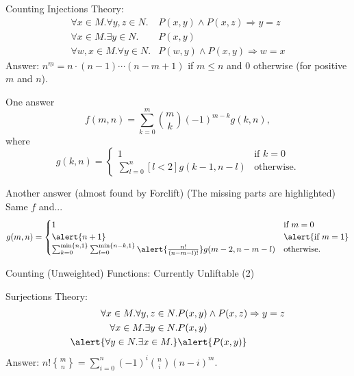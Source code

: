 \documentclass{beamer}
\DeclareRobustCommand{\stirling}{\genfrac\{\}{0pt}{}}
\begin{document}
\begin{frame}{Counting Injections}
  Theory:
  \begin{align*}
    \forall x \in M. \forall y, z \in N. &P(x, y) \land P(x, z) \Rightarrow y=z \\
    \forall x \in M. \exists y \in N. &P(x, y) \\
    \forall w, x \in M. \forall y \in N. &P(w, y) \land P(x, y) \Rightarrow w=x
  \end{align*}
  Answer: $n^{\underline{m}} = n \cdot (n-1)\cdots(n-m+1)$ if $m \le n$ and $0$ otherwise (for positive $m$ and $n$).
\end{frame}

\begin{frame}
  \begin{block}{One answer}
    \[
    f(m, n) = \sum_{k=0}^m \binom{m}{k}(-1)^{m-k}g(k, n),
    \]
    where
    \[
    g(k, n) =
    \begin{cases}
      1 & \text{if } k = 0 \\
      \sum_{l=0}^n [l < 2]g(k-1, n-l) & \text{otherwise.}
    \end{cases}
    \]
  \end{block}
  \begin{block}{Another answer (almost found by Forclift)}
    (The missing parts are highlighted) Same $f$ and...
    \[
    g(m, n) =
    \begin{cases}
      1 & \text{if } m = 0 \\
      \alert{n+1} & \alert{\text{if } m = 1} \\
      \sum_{k=0}^{\min\{n, 1\}} \sum_{l=0}^{\min\{n-k, 1\}} \alert{\frac{n!}{(n-m-l)!}} g(m-2, n-m-l) & \text{otherwise.}
    \end{cases}
    \]
  \end{block}
\end{frame}

\begin{frame}{Counting (Unweighted) Functions: Currently Unliftable (2)}
  \begin{block}{Surjections}
    Theory:
    \begin{align*}
      \forall x \in M. \forall y, z \in N. &P(x, y) \land P(x, z) \Rightarrow y=z \\
      \forall x \in M. \exists y \in N. &P(x, y) \\
      \alert{\forall y \in N. \exists x \in M.} &\alert{P(x, y)}
    \end{align*}
    Answer: $n!\stirling{m}{n} = \sum_{i=0}^n (-1)^i\binom{n}{i}(n-i)^m$.
  \end{block}
\end{frame}
\end{document}
